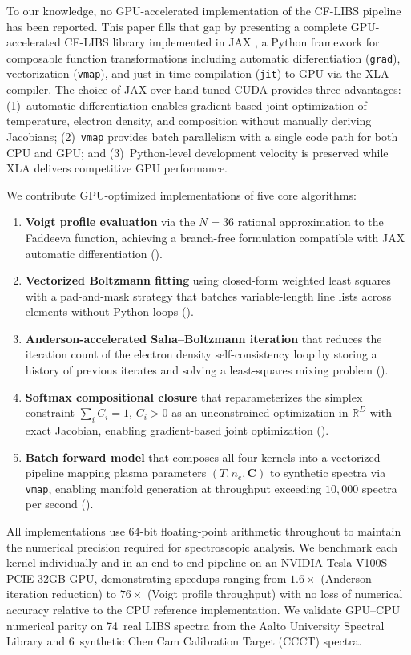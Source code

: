 \documentclass[preprint,12pt,authoryear]{elsarticle}
\begin{document}
To our knowledge, no GPU-accelerated implementation of the CF-LIBS pipeline has been reported.
This paper fills that gap by presenting a complete GPU-accelerated CF-LIBS library implemented in JAX \citep{Bradbury2018}, a Python framework for composable function transformations including automatic differentiation (\texttt{grad}), vectorization (\texttt{vmap}), and just-in-time compilation (\texttt{jit}) to GPU via the XLA compiler.
The choice of JAX over hand-tuned CUDA provides three advantages: (1)~automatic differentiation enables gradient-based joint optimization of temperature, electron density, and composition without manually deriving Jacobians; (2)~\texttt{vmap} provides batch parallelism with a single code path for both CPU and GPU; and (3)~Python-level development velocity is preserved while XLA delivers competitive GPU performance.

We contribute GPU-optimized implementations of five core algorithms:
\begin{enumerate}
  \item \textbf{Voigt profile evaluation} via the \citet{Weideman1994} $N=36$ rational approximation to the Faddeeva function, achieving a branch-free formulation compatible with JAX automatic differentiation ().
  \item \textbf{Vectorized Boltzmann fitting} using closed-form weighted least squares with a pad-and-mask strategy that batches variable-length line lists across elements without Python loops ().
  \item \textbf{Anderson-accelerated Saha--Boltzmann iteration} that reduces the iteration count of the electron density self-consistency loop by storing a history of previous iterates and solving a least-squares mixing problem \citep{Walker2011,Evans2018} ().
  \item \textbf{Softmax compositional closure} that reparameterizes the simplex constraint $\sum_i C_i = 1$, $C_i > 0$ as an unconstrained optimization in $\mathbb{R}^D$ with exact Jacobian, enabling gradient-based joint optimization ().
  \item \textbf{Batch forward model} that composes all four kernels into a vectorized pipeline mapping plasma parameters $(T, n_e, \bm{C})$ to synthetic spectra via \texttt{vmap}, enabling manifold generation at throughput exceeding $10{,}000$ spectra per second ().
\end{enumerate}

All implementations use 64-bit floating-point arithmetic throughout to maintain the numerical precision required for spectroscopic analysis.
We benchmark each kernel individually and in an end-to-end pipeline on an NVIDIA Tesla V100S-PCIE-32GB GPU, demonstrating speedups ranging from $1.6\times$ (Anderson iteration reduction) to $76\times$ (Voigt profile throughput) with no loss of numerical accuracy relative to the CPU reference implementation.
We validate GPU--CPU numerical parity on 74~real LIBS spectra from the Aalto University Spectral Library and 6~synthetic ChemCam Calibration Target (CCCT) spectra.
\end{document}
